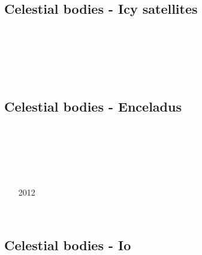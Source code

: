 \subsection{Celestial bodies - Icy satellites}

\begin{scriptsize}
\begin{itemize}
\item[\twothousandtwelve] 
\textcite{kasc12b} \\
\item[\twothousandnineteen] 
\textcite{wefb19} \\
\item[\twothousandtwentytwo] 
\textcite{kibm22} \\
\end{itemize}
\end{scriptsize}

\subsection{Celestial bodies - Enceladus}

\begin{scriptsize}
\begin{itemize}
\item[\twothousandeight] 
\textcite{roni08} \\
\item[\twothousandnine]
\textcite{stfm09} \\
\item[\twothousandten]
\textcite{betc10} \\
\item[2012] 
\textcite{hats12} \\
\item[\twothousandfourteen]
\textcite{robg14} \\
\end{itemize}
\end{scriptsize}

\subsection{Celestial bodies - Io}


